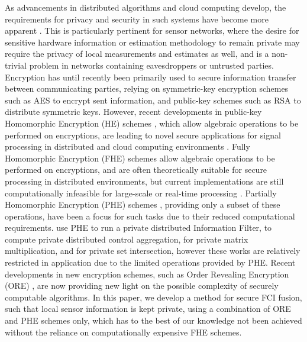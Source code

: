 \documentclass[letterpaper, 10 pt, journal, twoside]{ieeetran}  %
\begin{document}
As advancements in distributed algorithms and cloud computing develop, the requirements for privacy and security in such systems have become more apparent \cite{renSecurityChallengesPublic2012,brennerSecretProgramExecution2011}. This is particularly pertinent for sensor networks, where the desire for sensitive hardware information or estimation methodology to remain private may require the privacy of local measurements and estimates as well, and is a non-trivial problem in networks containing eavesdroppers or untrusted parties. Encryption has until recently been primarily used to secure information transfer between communicating parties, relying on symmetric-key encryption schemes such as AES \cite{gueronIntelAdvancedEncryption2010} to encrypt sent information, and public-key schemes such as RSA \cite{rivestMethodObtainingDigital1978} to distribute symmetric keys. However, recent developments in public-key Homomorphic Encryption (HE) schemes \cite{gentryFullyHomomorphicEncryption2009,stehleFasterFullyHomomorphic2010,elgamalPublicKeyCryptosystem1985,paillierPublicKeyCryptosystemsBased1999}, which allow algebraic operations to be performed on encryptions, are leading to novel secure applications for signal processing in distributed and cloud computing environments \cite{lagendijkEncryptedSignalProcessing2012,aristovEncryptedMultisensorInformation2018,farokhiSecurePrivateControl2017,alexandruEncryptedCooperativeControl2019,kogisoCyberSecurityEnhancementNetworked2015,kerschbaumOutsourcedPrivateSet2012}. Fully Homomorphic Encryption (FHE) schemes \cite{gentryFullyHomomorphicEncryption2009,stehleFasterFullyHomomorphic2010} allow algebraic operations to be performed on encryptions, and are often theoretically suitable for secure processing in distributed environments, but current implementations are still computationally infeasible for large-scale or real-time processing \cite{acarSurveyHomomorphicEncryption2018}. Partially Homomorphic Encryption (PHE) schemes \cite{elgamalPublicKeyCryptosystem1985,paillierPublicKeyCryptosystemsBased1999}, providing only a subset of these operations, have been a focus for such tasks due to their reduced computational requirements. \cite{aristovEncryptedMultisensorInformation2018} use PHE to run a private distributed Information Filter, \cite{alexandruEncryptedCooperativeControl2019,farokhiSecurePrivateControl2017} to compute private distributed control aggregation, \cite{kogisoCyberSecurityEnhancementNetworked2015} for private matrix multiplication, and \cite{kerschbaumOutsourcedPrivateSet2012} for private set intersection, however these works are relatively restricted in application due to the limited operations provided by PHE. Recent developments in new encryption schemes, such as Order Revealing Encryption (ORE) \cite{chenettePracticalOrderRevealingEncryption2016,lewiOrderRevealingEncryptionNew2016,bogatovComparativeEvaluationOrderPreserving2018}, are now providing new light on the possible complexity of securely computable algorithms. In this paper, we develop a method for secure FCI fusion, such that local sensor information is kept private, using a combination of ORE and PHE schemes only, which has to the best of our knowledge not been achieved without the reliance on computationally expensive FHE schemes.
\end{document}
